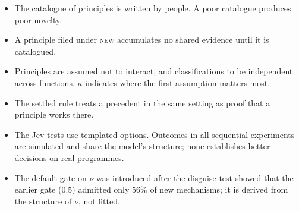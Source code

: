 \documentclass[11pt]{article}
\begin{document}
\begin{itemize}
\item The catalogue of principles is written by people. A poor catalogue produces poor novelty.
\item A principle filed under \textsc{new} accumulates no shared evidence until it is catalogued.
\item Principles are assumed not to interact, and classifications to be independent across
functions. $\kappa$ indicates where the first assumption matters most.
\item The settled rule treats a precedent in the same setting as proof that a principle works there.
\item The Jev tests use templated options. Outcomes in all sequential experiments are simulated
and share the model's structure; none establishes better decisions on real programmes.
\item The default gate on $\nu$ was introduced after the disguise test showed that the earlier gate
($0.5$) admitted only $56\%$ of new mechanisms; it is derived from the structure of $\nu$, not fitted.
\end{itemize}
\end{document}
